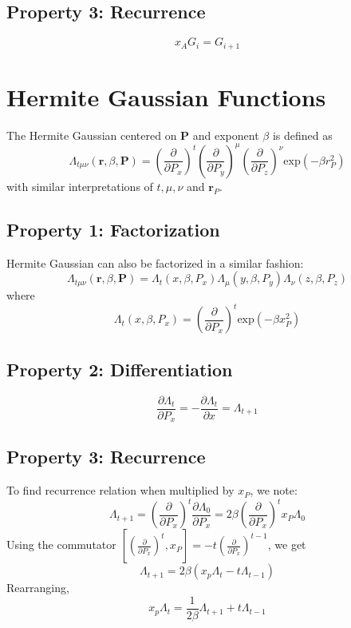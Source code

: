 \subsection*{Property 3: Recurrence}
\begin{equation}
    x_AG_i = G_{i+1}
\end{equation}
\section{Hermite Gaussian Functions}
The Hermite Gaussian centered on $\mathbf{P}$ and exponent $\beta$ is defined as 
\begin{equation}
    \Lambda_{t\mu\nu}(\mathbf{r},\beta,\mathbf{P}) = \left(\frac{\partial}{\partial P_x}\right)^t\left(\frac{\partial}{\partial P_y}\right)^\mu\left(\frac{\partial}{\partial P_z}\right)^\nu
    \text{exp}(-\beta r_P^2)
\end{equation}
with similar interpretations of $t,\mu,\nu$ and $\mathbf{r}_P$.
\subsection*{Property 1: Factorization}
Hermite Gaussian can also be factorized in a similar fashion:
\begin{equation}
    \Lambda_{t\mu\nu}(\mathbf{r},\beta,\mathbf{P}) = \Lambda_t(x,\beta,P_x)\Lambda_\mu(y,\beta,P_y)\Lambda_\nu(z,\beta,P_z)
\end{equation}
where 
\begin{equation}
    \Lambda_t(x,\beta,P_x) = \left(\frac{\partial}{\partial P_x}\right)^t\text{exp}(-\beta x_P^2)
\end{equation}
\subsection*{Property 2: Differentiation}
\begin{equation}
    \frac{\partial\Lambda_t}{\partial P_x} = -\frac{\partial\Lambda_t}{\partial x} = \Lambda_{t+1}
\end{equation}
\subsection*{Property 3: Recurrence}
To find recurrence relation when multiplied by $x_P$, we note:
\begin{equation}
    \Lambda_{t+1} = \left(\frac{\partial}{\partial P_x}\right)^t\frac{\partial\Lambda_0}{\partial P_x} = 2\beta\left(\frac{\partial}{\partial P_x}\right)^tx_P\Lambda_0
\end{equation}
Using the commutator $\left[\left(\frac{\partial}{\partial P_x}\right)^t,x_P\right] = -t\left(\frac{\partial}{\partial P_x}\right)^{t-1}$, we get 
\begin{equation}
    \Lambda_{t+1} = 2\beta(x_p\Lambda_t - t\Lambda_{t-1})
\end{equation}
Rearranging, 
\begin{equation}
    x_p\Lambda_t = \frac{1}{2\beta}\Lambda_{t+1} + t\Lambda_{t-1}
\end{equation}
